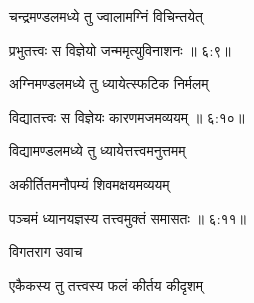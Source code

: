 {\devanagarifont चन्द्रमण्डलमध्ये तु ज्वालामग्निं विचिन्तयेत् \thinspace{\dandab} \dontdisplaylinenum }%


{\devanagarifont प्रभुतत्त्वः स विज्ञेयो जन्ममृत्युविनाशनः {॥ ६:९॥} \veg\dontdisplaylinenum }%

{\devanagarifont अग्निमण्डलमध्ये तु ध्यायेत्स्फटिक निर्मलम् \thinspace{\dandab} \dontdisplaylinenum }%


{\devanagarifont विद्यातत्त्वः स विज्ञेयः कारणमजमव्ययम् {॥ ६:१०॥} \veg\dontdisplaylinenum }%

{\devanagarifont विद्यामण्डलमध्ये तु ध्यायेत्तत्त्वमनुत्तमम् \thinspace{\dandab} \dontdisplaylinenum }%

{\devanagarifont अकीर्तितमनौपम्यं शिवमक्षयमव्ययम्  \danda\dontdisplaylinenum }%


{\devanagarifont पञ्चमं ध्यानयज्ञस्य तत्त्वमुक्तं समासतः {॥ ६:११॥} \veg\dontdisplaylinenum }%

{\devanagarifont विगतराग उवाच {\dandab}\dontdisplaylinenum  }%
 
{\devanagarifont एकैकस्य तु तत्त्वस्य फलं कीर्तय कीदृशम् \thinspace{\danda} \dontdisplaylinenum }%


